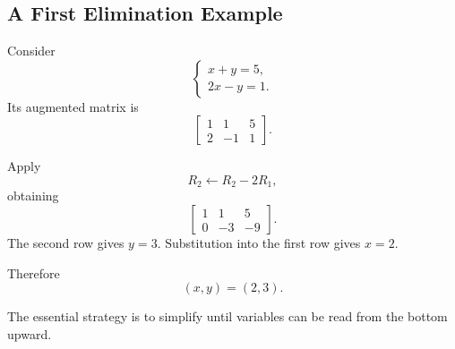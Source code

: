 \subsection{A First Elimination Example}

Consider
\[
\begin{cases}
x+y=5,\\
2x-y=1.
\end{cases}
\]
Its augmented matrix is
\[
\left[\begin{array}{cc|c}
1&1&5\\2&-1&1
\end{array}\right].
\]

\begin{derivationbox}
Apply
\[
R_2\leftarrow R_2-2R_1,
\]
obtaining
\[
\left[\begin{array}{cc|c}
1&1&5\\0&-3&-9
\end{array}\right].
\]
The second row gives $y=3$. Substitution into the first row gives $x=2$.
\end{derivationbox}

Therefore
\[
\boxed{(x,y)=(2,3)}.
\]

The essential strategy is to simplify until variables can be read from the bottom upward.
